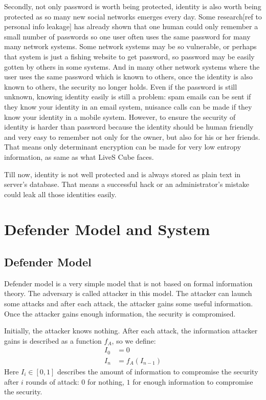 \documentclass[10pt,a4paper]{article}
\begin{document}
	Secondly, not only password is worth being protected, identity is also worth being protected as
	so many new social networks emerges every day. Some research[ref to personal info leakage] has already shown
	that one human could only remember a small number of passwords so one user often
	uses the same password for many many network systems. Some network systems may be
	so vulnerable, or perhaps that system is just a fishing website to get password, so
	password may be easily gotten by others in some systems. And in many other network
	systems where the user uses the same password which is known to others, 
	once the identity is also known to others,
	the security no longer holds. Even if the password is still unknown, knowing identity
	easily is still a problem: spam emails can be sent if they know your identity in an email system,
	nuisance calls can be made if they know your identity in a mobile system. However,
	to ensure the security of identity is harder than password because the identity should
	be human friendly and very easy to remember not only for the owner, but also for his or her friends.
	That means only determinant encryption can be made for very low entropy information, as 
	same as what LiveS Cube faces.
	
	Till now, identity is not well protected and is always stored as plain text in server's database. That means
	a successful hack or an administrator's mistake could leak all those identities easily.
	
\section{Defender Model and System}
	\subsection{Defender Model}
		Defender model is a very simple model that
		is not based on formal information theory.
		The adversary is called attacker in this model.
		The attacker can launch some attacks and after
		each attack, the attacker gains some useful information.
		Once the attacker gains enough information, the security
		is compromised.
		
		Initially, the attacker knows nothing. After
		each attack, the information attacker gains
		is described as a function $f_A$, so we define:
		\begin{align}
			I_0 &= 0\\
			I_n &= f_A(I_{n-1})\label{AONLY}
		\end{align}
		Here $I_i \in [0, 1]$ describes the amount of information
		to compromise the security after $i$
		rounds of attack: $0$ for nothing, $1$ for enough
		information to compromise the security.
		
\end{document}
